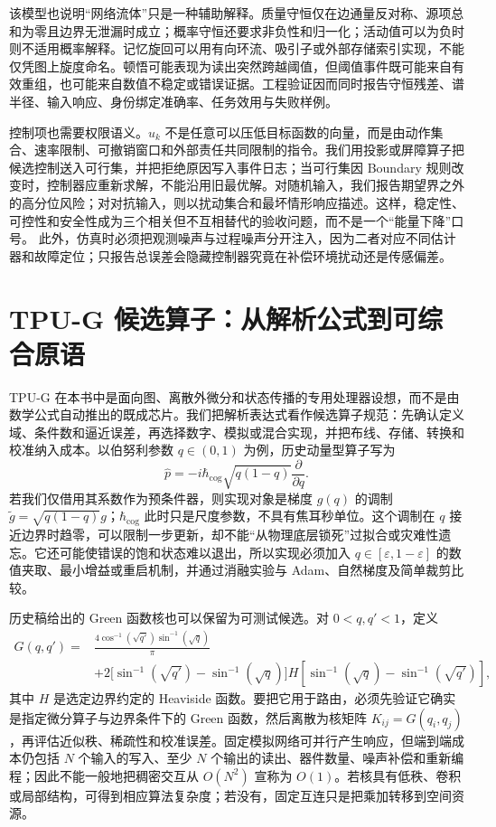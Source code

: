 该模型也说明“网络流体”只是一种辅助解释。质量守恒仅在边通量反对称、源项总和为零且边界无泄漏时成立；概率守恒还要求非负性和归一化；活动值可以为负时则不适用概率解释。记忆旋回可以用有向环流、吸引子或外部存储索引实现，不能仅凭图上旋度命名。顿悟可能表现为读出突然跨越阈值，但阈值事件既可能来自有效重组，也可能来自数值不稳定或错误证据。工程验证因而同时报告守恒残差、谱半径、输入响应、身份绑定准确率、任务效用与失败样例。

控制项也需要权限语义。$u_k$ 不是任意可以压低目标函数的向量，而是由动作集合、速率限制、可撤销窗口和外部责任共同限制的指令。我们用投影或屏障算子把候选控制送入可行集，并把拒绝原因写入事件日志；当可行集因 Boundary 规则改变时，控制器应重新求解，不能沿用旧最优解。对随机输入，我们报告期望界之外的高分位风险；对对抗输入，则以扰动集合和最坏情形响应描述。这样，稳定性、可控性和安全性成为三个相关但不互相替代的验收问题，而不是一个“能量下降”口号。
此外，仿真时必须把观测噪声与过程噪声分开注入，因为二者对应不同估计器和故障定位；只报告总误差会隐藏控制器究竟在补偿环境扰动还是传感偏差。

\section{TPU-G 候选算子：从解析公式到可综合原语}
\label{sec:tpug_operator_design_formulas}

TPU-G 在本书中是面向图、离散外微分和状态传播的专用处理器设想，而不是由数学公式自动推出的既成芯片。我们把解析表达式看作候选算子规范：先确认定义域、条件数和逼近误差，再选择数字、模拟或混合实现，并把布线、存储、转换和校准纳入成本。以伯努利参数 $q\in(0,1)$ 为例，历史动量型算子写为
\begin{equation}
\hat p=-i\hbar_{\mathrm{cog}}\sqrt{q(1-q)}\frac{\partial}{\partial q}.
\end{equation}
若我们仅借用其系数作为预条件器，则实现对象是梯度 $g(q)$ 的调制 $\tilde g=\sqrt{q(1-q)}g$；$\hbar_{\mathrm{cog}}$ 此时只是尺度参数，不具有焦耳秒单位。这个调制在 $q$ 接近边界时趋零，可以限制一步更新，却不能“从物理底层锁死”过拟合或灾难性遗忘。它还可能使错误的饱和状态难以退出，所以实现必须加入 $q\in[\varepsilon,1-\varepsilon]$ 的数值夹取、最小增益或重启机制，并通过消融实验与 Adam、自然梯度及简单裁剪比较。

历史稿给出的 Green 函数核也可以保留为可测试候选。对 $0<q,q'<1$，定义
\begin{align}
G(q,q')={}&\frac{4\cos^{-1}(\sqrt{q'})\sin^{-1}(\sqrt q)}{\pi}\nonumber\\
&+2\big[\sin^{-1}(\sqrt{q'})-\sin^{-1}(\sqrt q)\big]
H\!\left[\sin^{-1}(\sqrt q)-\sin^{-1}(\sqrt{q'})\right],
\end{align}
其中 $H$ 是选定边界约定的 Heaviside 函数。要把它用于路由，必须先验证它确实是指定微分算子与边界条件下的 Green 函数，然后离散为核矩阵 $K_{ij}=G(q_i,q_j)$，再评估近似秩、稀疏性和校准误差。固定模拟网络可并行产生响应，但端到端成本仍包括 $N$ 个输入的写入、至少 $N$ 个输出的读出、器件数量、噪声补偿和重新编程；因此不能一般地把稠密交互从 $O(N^2)$ 宣称为 $O(1)$。若核具有低秩、卷积或局部结构，可得到相应算法复杂度；若没有，固定互连只是把乘加转移到空间资源。

